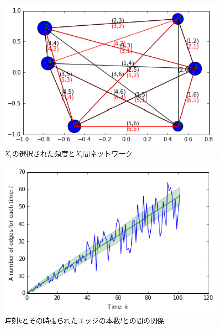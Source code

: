 \begin{figure}[H]
    \begin{center}
        \includegraphics[width=12.5cm]{../download2_2.png}
        \caption{$X_{i}$の選択された頻度と$X_{i}$間ネットワーク}
        \label{fig:f4}
    \end{center}
\end{figure}
\begin{figure}[H]
    \begin{center}
        \includegraphics[width=12.5cm]{../download2_3.png}
        \caption{時刻$k$とその時張られたエッジの本数$l$との間の関係}
        \label{fig:f5}
    \end{center}
\end{figure}
